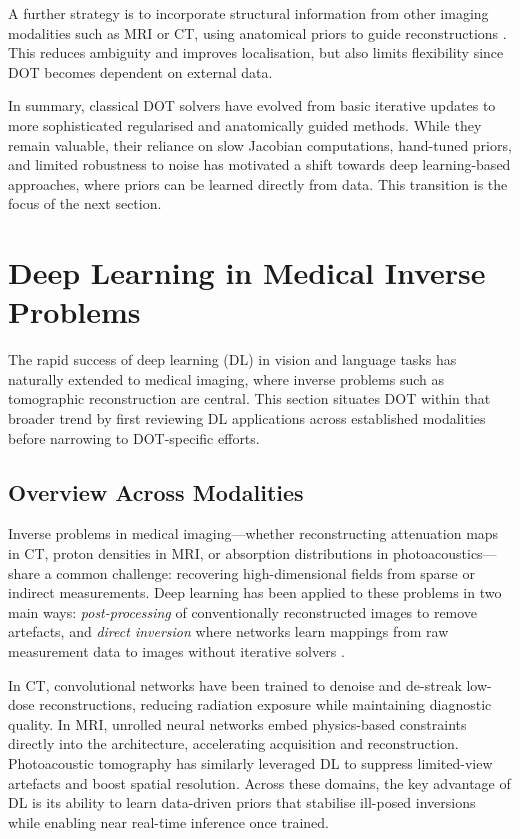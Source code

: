 A further strategy is to incorporate structural information from other imaging modalities such as MRI or CT, using anatomical priors to guide reconstructions \cite{arridge1999}. This reduces ambiguity and improves localisation, but also limits flexibility since DOT becomes dependent on external data.  

In summary, classical DOT solvers have evolved from basic iterative updates to more sophisticated regularised and anatomically guided methods. While they remain valuable, their reliance on slow Jacobian computations, hand-tuned priors, and limited robustness to noise has motivated a shift towards deep learning-based approaches, where priors can be learned directly from data. This transition is the focus of the next section.

\section{Deep Learning in Medical Inverse Problems}
The rapid success of deep learning (DL) in vision and language tasks has naturally extended to medical imaging, where inverse problems such as tomographic reconstruction are central. This section situates DOT within that broader trend by first reviewing DL applications across established modalities before narrowing to DOT-specific efforts.

\subsection{Overview Across Modalities}
Inverse problems in medical imaging—whether reconstructing attenuation maps in CT, proton densities in MRI, or absorption distributions in photoacoustics—share a common challenge: recovering high-dimensional fields from sparse or indirect measurements. Deep learning has been applied to these problems in two main ways: \emph{post-processing} of conventionally reconstructed images to remove artefacts, and \emph{direct inversion} where networks learn mappings from raw measurement data to images without iterative solvers \cite{monga2021}.  

In CT, convolutional networks have been trained to denoise and de-streak low-dose reconstructions, reducing radiation exposure while maintaining diagnostic quality. In MRI, unrolled neural networks embed physics-based constraints directly into the architecture, accelerating acquisition and reconstruction. Photoacoustic tomography has similarly leveraged DL to suppress limited-view artefacts and boost spatial resolution. Across these domains, the key advantage of DL is its ability to learn data-driven priors that stabilise ill-posed inversions while enabling near real-time inference once trained.

